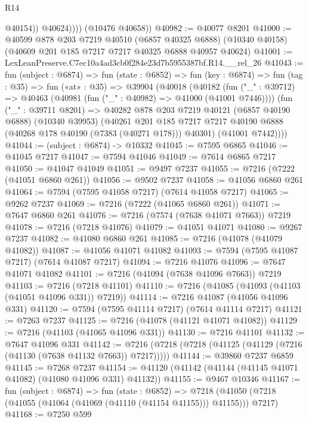 \begin{lexlean}{R14}
\begin{coremodule}
                  @40154))
              @40624))))
      (@10476 @40658))
@40982 := @40077 @8201
@41000 := @40599
    @878
    @203
    @7219
    @40510
    (@6857 @40325 @6888)
    (@10340 @40158)
    (@40609 @201 @185 @7217 @7217 @40325 @6888 @40957 @40624)
@41001 := LexLeanPreserve.C7ec10a4ad3cb0f284e23d7b5955387bf.R14.__rel_26
@41043 := fun (subject : @6874) =>
  fun (state : @6852) =>
  fun (key : @6874) =>
  fun (tag : @35) =>
  fun («at» : @35) =>
  @39904
    (@40018
      (@40182
        (fun ("_" : @39712) => @40463 (@40981 (fun ("_" : @40982) => @41000 (@41001 @7446))))
        (fun ("_" : @39711 @8201) =>
        @40282
          @878
          @203
          @7219
          @40121
          (@6857 @40190 @6888)
          (@10340 @39953)
          (@40261
            @201
            @185
            @7217
            @7217
            @40190
            @6888
            (@40268 @178 @40190 (@7383 (@40271 @178)))
            @40301)
          (@41001 @7442))))
@41044 := (subject : @6874) -> @10332
@41045 := @7595 @6865
@41046 := @41045 @7217
@41047 := @7594 @41046
@41049 := @7614 @6865 @7217
@41050 := @41047 @41049
@41051 := @9497 @7237
@41055 := @7216 (@7222 (@41051 @6860 @261))
@41056 := @9502 @7237
@41058 := @41056 @6860 @261
@41064 := @7594 (@7595 @41058 @7217) (@7614 @41058 @7217)
@41065 := @9262 @7237
@41069 := @7216 (@7222 (@41065 @6860 @261))
@41071 := @7647 @6860 @261
@41076 := @7216 (@7574 (@7638 @41071 @7663)) @7219
@41078 := @7216 (@7218 @41076)
@41079 := @41051 @41071
@41080 := @9267 @7237
@41082 := @41080 @6860 @261
@41085 := @7216 (@41078 (@41079 @41082))
@41087 := @41056 @41071 @41082
@41093 := @7594 (@7595 @41087 @7217) (@7614 @41087 @7217)
@41094 := @7216 @41076
@41096 := @7647 @41071 @41082
@41101 := @7216 (@41094 (@7638 @41096 @7663)) @7219
@41103 := @7216 (@7218 @41101)
@41110 := @7216 (@41085 (@41093 (@41103 (@41051 @41096 @331)) @7219))
@41114 := @7216 @41087 (@41056 @41096 @331)
@41120 := @7594 (@7595 @41114 @7217) (@7614 @41114 @7217)
@41121 := @7263 @7237
@41125 := @7216 (@41078 (@41121 @41071 @41082))
@41129 := @7216 (@41103 (@41065 @41096 @331))
@41130 := @7216 @41101
@41132 := @7647 @41096 @331
@41142 := @7216 (@7218 (@7218 (@41125 (@41129 (@7216 (@41130 (@7638 @41132 @7663)) @7217)))))
@41144 := @39860 @7237 @6859
@41145 := @7268 @7237
@41154 := @41120 (@41142 (@41144 (@41145 @41071 @41082) (@41080 @41096 @331) @41132))
@41155 := @9467 @10346
@41167 := fun (subject : @6874) =>
  fun (state : @6852) =>
  @7218 (@41050 (@7218 (@41055 (@41064 (@41069 (@41110 (@41154 @41155))) @41155))) @7217)
@41168 := @7250 @599

\end{coremodule}
\end{lexlean}
